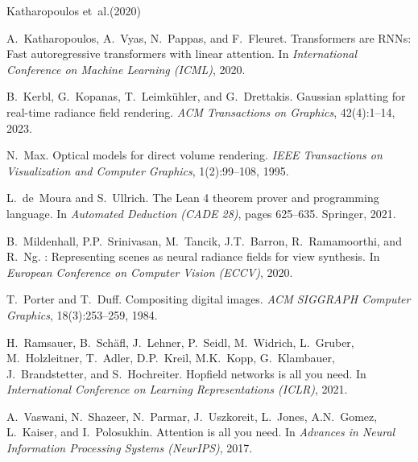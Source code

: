 \documentclass[twoside,11pt]{article}
\begin{document}


\begin{thebibliography}{Katharopoulos et~al.(2020)}

A.~Katharopoulos, A.~Vyas, N.~Pappas, and F.~Fleuret.
\newblock Transformers are {RNN}s: Fast autoregressive transformers with linear attention.
\newblock In \emph{International Conference on Machine Learning (ICML)}, 2020.

B.~Kerbl, G.~Kopanas, T.~Leimk{\"u}hler, and G.~Drettakis.
 {G}aussian splatting for real-time radiance field rendering.
\newblock \emph{ACM Transactions on Graphics}, 42(4):1--14, 2023.

N.~Max.
\newblock Optical models for direct volume rendering.
\newblock \emph{IEEE Transactions on Visualization and Computer Graphics}, 1(2):99--108, 1995.

L.~de~Moura and S.~Ullrich.
\newblock The {L}ean 4 theorem prover and programming language.
\newblock In \emph{Automated Deduction (CADE 28)}, pages 625--635. Springer, 2021.

B.~Mildenhall, P.P.~Srinivasan, M.~Tancik, J.T.~Barron, R.~Ramamoorthi, and R.~Ng.
: Representing scenes as neural radiance fields for view synthesis.
\newblock In \emph{European Conference on Computer Vision (ECCV)}, 2020.

T.~Porter and T.~Duff.
\newblock Compositing digital images.
\newblock \emph{ACM SIGGRAPH Computer Graphics}, 18(3):253--259, 1984.

H.~Ramsauer, B.~Sch{\"a}fl, J.~Lehner, P.~Seidl, M.~Widrich, L.~Gruber, M.~Holzleitner, T.~Adler, D.P.~Kreil, M.K.~Kopp, G.~Klambauer, J.~Brandstetter, and S.~Hochreiter.
\newblock Hopfield networks is all you need.
\newblock In \emph{International Conference on Learning Representations (ICLR)}, 2021.

A.~Vaswani, N.~Shazeer, N.~Parmar, J.~Uszkoreit, L.~Jones, A.N.~Gomez, L.~Kaiser, and I.~Polosukhin.
\newblock Attention is all you need.
\newblock In \emph{Advances in Neural Information Processing Systems (NeurIPS)}, 2017.

\end{thebibliography}
\end{document}
